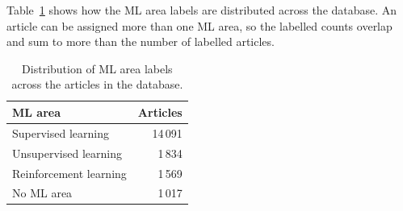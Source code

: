 Table~\ref{tab:ml-area-distribution} shows how the ML area labels
are distributed across the database. An article can be assigned
more than one ML area, so the labelled counts overlap and sum to
more than the number of labelled articles.

\begin{table}[H]
\centering
\caption[ML area distribution]{Distribution of ML area labels
across the articles in the database.}
\label{tab:ml-area-distribution}
\begin{tabularx}{0.8\textwidth}{Xr}
\toprule
\textbf{ML area} & \textbf{Articles} \\
\midrule
Supervised learning & 14\,091 \\
Unsupervised learning & 1\,834 \\
Reinforcement learning & 1\,569 \\
No ML area & 1\,017 \\
\bottomrule
\end{tabularx}
\end{table}